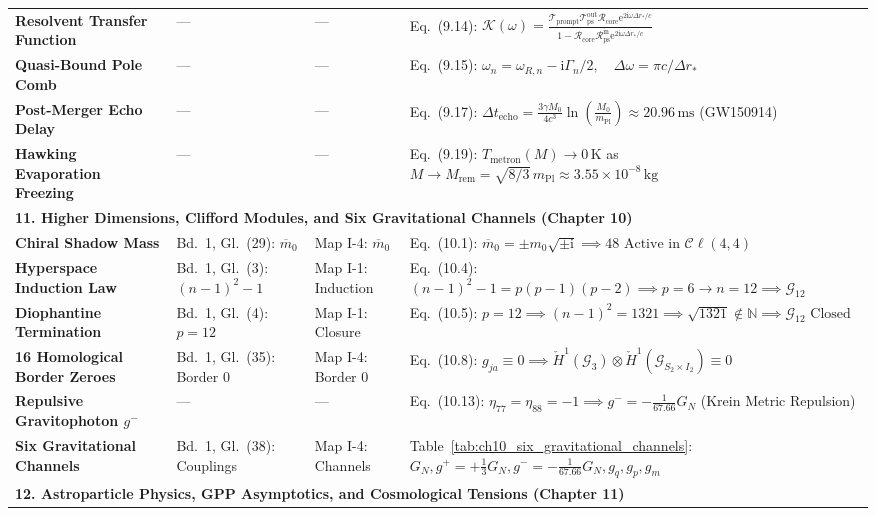 \documentclass[
    12pt,
    a4paper,
    headings=normal,
    twoside=false,
    open=any,
    parskip=half
]{scrbook}
\newcommand{\iu}{\mathrm{i}}
\newcommand{\eu}{\mathrm{e}}
\begin{document}
\begin{longtable}{p{3.4cm}p{3.2cm}p{3.2cm}p{5.4cm}}
\textbf{Resolvent Transfer Function} & — & — & Eq.~(9.14): $\mathcal{K}(\omega) = \frac{\mathcal{T}_{\text{prompt}}\mathcal{T}_{\text{ps}}^{\text{out}}\mathcal{R}_{\text{core}}\eu^{2\iu\omega\Delta r_*/c}}{1 - \mathcal{R}_{\text{core}}\mathcal{R}_{\text{ps}}^{\text{in}}\eu^{2\iu\omega\Delta r_*/c}}$ \\
\textbf{Quasi-Bound Pole Comb} & — & — & Eq.~(9.15): $\omega_n = \omega_{R, n} - \iu \Gamma_n/2, \quad \Delta\omega = \pi c / \Delta r_*$ \\
\textbf{Post-Merger Echo Delay} & — & — & Eq.~(9.17): $\Delta t_{\text{echo}} = \frac{3\gamma M_0}{4c^3}\ln(\frac{M_0}{m_{\text{Pl}}}) \approx 20.96\,\text{ms}$ (GW150914) \\
\textbf{Hawking Evaporation Freezing}& — & — & Eq.~(9.19): $T_{\text{metron}}(M) \to 0\,\text{K}$ as $M \to M_{\text{rem}} = \sqrt{8/3}\,m_{\text{Pl}} \approx 3.55 \times 10^{-8}\,\text{kg}$ \\\midrule
\multicolumn{4}{l}{\textsf{\textbf{\color{maincolor!90!black}11. Higher Dimensions, Clifford Modules, and Six Gravitational Channels (Chapter 10)}}} \\\midrule
\textbf{Chiral Shadow Mass} & Bd.~1, Gl.~(29): $\overline{m}_0$ & Map I-4: $\overline{m}_0$ & Eq.~(10.1): $\overline{m}_0 = \pm m_0\sqrt{\pm\iu} \implies 48 \text{ Active in } \mathcal{C}\ell(4,4)$ \\
\textbf{Hyperspace Induction Law} & Bd.~1, Gl.~(3): $(n-1)^2-1$ & Map I-1: Induction & Eq.~(10.4): $(n-1)^2-1 = p(p-1)(p-2) \implies p=6 \to n=12 \implies \mathcal{G}_{12}$ \\
\textbf{Diophantine Termination} & Bd.~1, Gl.~(4): $p=12$ & Map I-1: Closure & Eq.~(10.5): $p=12 \implies (n-1)^2 = 1321 \implies \sqrt{1321}\notin\mathbb{N} \implies \mathcal{G}_{12} \text{ Closed}$ \\
\textbf{16 Homological Border Zeroes}& Bd.~1, Gl.~(35): Border 0 & Map I-4: Border 0 & Eq.~(10.8): $g_{ja} \equiv 0 \implies \check{H}^1(\mathcal{G}_3) \otimes \check{H}^1(\mathcal{G}_{S_2\times I_2}) \equiv 0$ \\
\textbf{Repulsive Gravitophoton $g^-$}& — & — & Eq.~(10.13): $\eta_{77}=\eta_{88}=-1 \implies g^- = -\frac{1}{67.66}G_N$ (Krein Metric Repulsion) \\
\textbf{Six Gravitational Channels} & Bd.~1, Gl.~(38): Couplings & Map I-4: Channels & Table~\ref{tab:ch10_six_gravitational_channels}: $G_N, g^+ = +\frac{1}{3}G_N, g^- = -\frac{1}{67.66}G_N, g_q, g_p, g_m$ \\\midrule
\multicolumn{4}{l}{\textsf{\textbf{\color{maincolor!90!black}12. Astroparticle Physics, GPP Asymptotics, and Cosmological Tensions (Chapter 11)}}} \\\midrule

\end{longtable}
\end{document}
